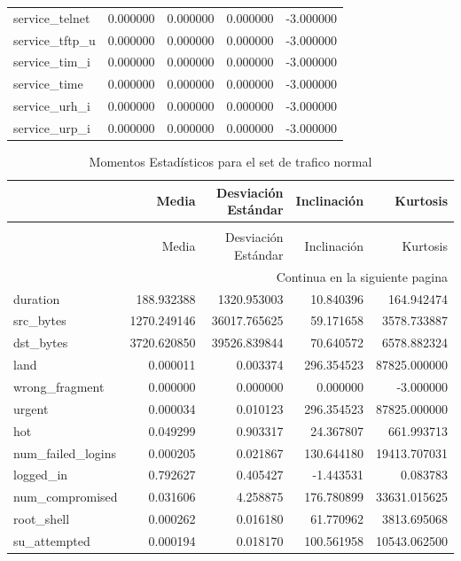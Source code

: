 \documentclass[12pt,a4paper]{article}
\begin{document}
\begin{longtable}{lrrrr}
  service_telnet & 0.000000 & 0.000000 & 0.000000 & -3.000000 \\
  service_tftp_u & 0.000000 & 0.000000 & 0.000000 & -3.000000 \\
  service_tim_i & 0.000000 & 0.000000 & 0.000000 & -3.000000 \\
  service_time & 0.000000 & 0.000000 & 0.000000 & -3.000000 \\
  service_urh_i & 0.000000 & 0.000000 & 0.000000 & -3.000000 \\
  service_urp_i & 0.000000 & 0.000000 & 0.000000 & -3.000000 \\
\end{longtable}

\begin{longtable}{lrrrr}
  \caption{Momentos Estadísticos para el set de trafico normal} \\
  \toprule
  & Media & Desviación Estándar & Inclinación & Kurtosis \\
  \midrule
  \endfirsthead
  \caption[]{Momentos Estadísticos para el set de trafico normal} \\
  \toprule
  & Media & Desviación Estándar & Inclinación & Kurtosis \\
  \midrule
  \endhead
  \midrule
  \multicolumn{5}{r}{Continua en la siguiente pagina} \\
  \midrule
  \endfoot
  \bottomrule
  \endlastfoot
  duration & 188.932388 & 1320.953003 & 10.840396 & 164.942474 \\
  src_bytes & 1270.249146 & 36017.765625 & 59.171658 & 3578.733887 \\
  dst_bytes & 3720.620850 & 39526.839844 & 70.640572 & 6578.882324 \\
  land & 0.000011 & 0.003374 & 296.354523 & 87825.000000 \\
  wrong_fragment & 0.000000 & 0.000000 & 0.000000 & -3.000000 \\
  urgent & 0.000034 & 0.010123 & 296.354523 & 87825.000000 \\
  hot & 0.049299 & 0.903317 & 24.367807 & 661.993713 \\
  num_failed_logins & 0.000205 & 0.021867 & 130.644180 & 19413.707031 \\
  logged_in & 0.792627 & 0.405427 & -1.443531 & 0.083783 \\
  num_compromised & 0.031606 & 4.258875 & 176.780899 & 33631.015625 \\
  root_shell & 0.000262 & 0.016180 & 61.770962 & 3813.695068 \\
  su_attempted & 0.000194 & 0.018170 & 100.561958 & 10543.062500 \\

\end{longtable}
\end{document}
